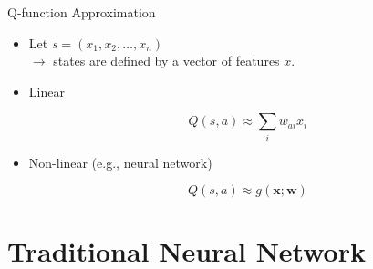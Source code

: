 \documentclass[11pt,table]{beamer}
\begin{document}
\begin{frame}{Q-function Approximation}


    \begin{itemize}
        \item  Let $s=\left(x_{1}, x_{2}, \ldots, x_{n}\right)$\\$\rightarrow$ states are defined by a vector of features $x$.

\item  Linear

$$
Q(s, a) \approx \sum_{i} w_{a i} x_{i}
$$

\item  Non-linear (e.g., neural network)

$$
Q(s, a) \approx g(\boldsymbol{x} ; \boldsymbol{w})
$$ 
    \end{itemize}
\end{frame}




\section{Traditional Neural Network}
\end{document}
